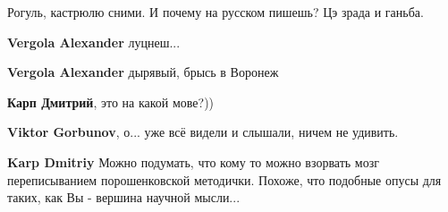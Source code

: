 \begin{itemize}
\begin{itemize}
 
Рогуль, кастрюлю сними. И почему на русском пишешь? Цэ зрада и ганьба.

 

\textbf{Vergola Alexander} луцнеш...

 
\textbf{Vergola Alexander} дырявый, брысь в Воронеж

 
\textbf{Карп Дмитрий}, это на какой мове?))

 
\textbf{Viktor Gorbunov}, о... уже всё видели и слышали, ничем не удивить.

 
\textbf{Karp Dmitriy} Можно подумать, что кому то можно взорвать мозг переписыванием порошенковской методички. Похоже, что подобные опусы для таких, как Вы - вершина научной мысли...

 

\end{itemize}
\end{itemize}
